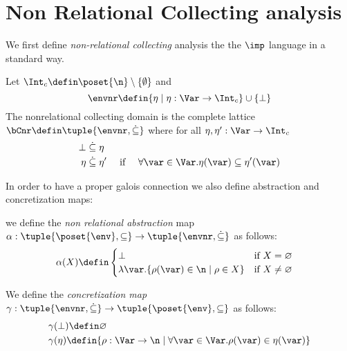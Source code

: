 \section{Non Relational Collecting analysis}
\label{sec:nonrel}

We first define \emph{non-relational collecting} analysis the the
\(\imp\) language in a standard way.

\begin{definition}
  Let \(\Int_c \defin \poset{\n} \setminus \{\emptyset\}\) and
  \begin{equation*}
    \envnr \defin \{\eta \mid \eta: \Var \to \Int_c\} \cup \{\bot\}
  \end{equation*}
  The nonrelational collecting domain is the complete lattice
  \(\bCnr \defin \tuple{\envnr,\dot{\subseteq}}\) where for all
  \(\eta,\eta':\Var \to \Int_c\)
  \begin{align*}
    \bot & \mathrel{\dot{\subseteq}} \eta\\
    \eta & \mathrel{\dot{\subseteq}} \eta' & \text{ if }\quad \forall
                                             \var\in \Var. \eta(\var)\subseteq \eta'(\var)
  \end{align*}
\end{definition}

In order to have a proper galois connection we also define abstraction
and concretization maps:

\begin{definition}
  we define the \emph{non relational abstraction} map
  \(\alpha: \tuple{\poset{\env},\subseteq} \to
  \tuple{\envnr,\dot{\subseteq}}\) as follows:
  \begin{align*}
    &\alpha(X) \defin 
      \begin{cases}
        \bot & \text{if }X=\varnothing\\
        \lambda \var. \{\rho(\var) \in \n \mid \rho \in X\} &\text{if }X\neq \varnothing\\
      \end{cases}
  \end{align*}
\end{definition}

\begin{definition}
  We define the \emph{concretization map}
  \(\gamma: \tuple{\envnr,\dot{\subseteq}} \to
  \tuple{\poset{\env},\subseteq}\) as follows:
  \begin{align*}
    &\gamma(\bot) \defin \varnothing\\
    &\gamma(\eta) \defin \{\rho : \Var \to \n \mid \forall \var \in \Var. \rho(\var)\in \eta(\var)\}
  \end{align*}
\end{definition}

